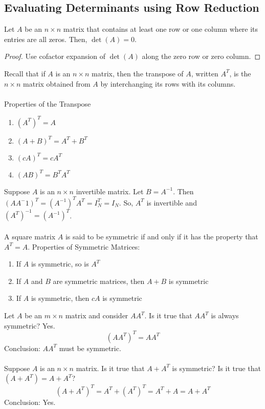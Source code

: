 \documentclass[12pt]{article}
\begin{document}
  \subsection{Evaluating Determinants using Row Reduction} 
  \begin{theorem} Let $A$ be an $n \times n$ matrix that contains at least one row or one column where its entries are all zeros. Then, $\det(A) = 0$. \end{theorem} 
  \begin{proof} Use cofactor expansion of $\det(A)$ along the zero row or zero column. \end{proof} 
  Recall that if $A$ is an $n \times n$ matrix, then the transpose of $A$, written $A^T$, is the $n \times n$ matrix obtained from $A$ by interchanging its rows with its columns. \\~\\
  Properties of the Transpose \begin{enumerate}
  \item $(A^T)^T = A $ \item $(A+ B)^T = A^T + B^T$ \item $(cA)^T = cA^T $ \item $ (AB)^T = B^TA^T $ \end{enumerate}
  Suppose $A$ is an $n \times n$ invertible matrix. Let $ B = A^{-1} $. Then $(AA^-1)^T = (A^{-1})^TA^T = I_N^T = I_N $. So, $A^T$ is invertible and $(A^T)^{-1} = (A^{-1})^T $. \\~\\
  A square matrix $A$ is said to be symmetric if and only if it has the property that $A^T = A$. \newpage
  Properties of Symmetric Matrices: \begin{enumerate}
  \item If $A$ is symmetric, so is $A^T$ \item If $A$ and $B$ are symmetric matrices, then $A + B$ is symmetric \item If $A$ is symmetric, then $cA$ is symmetric \end{enumerate} 
  Let $A$ be an $m \times n$ matrix and consider $AA^T$.  Is it true that $AA^T$ is always symmetric? Yes. $$(AA^T)^T = AA^T $$ 
  Conclusion: $AA^T$ must be symmetric. \\~\\ 
  Suppose $A$ is an $n \times n$ matrix. Is it true that $A + A^T$ is symmetric? Is it true that $(A + A^T) = A + A^T$? $$ (A + A^T)^T = A^T + (A^T)^T = A^T + A = A + A^T $$ Conclusion: Yes. \\~\\
\end{document}
